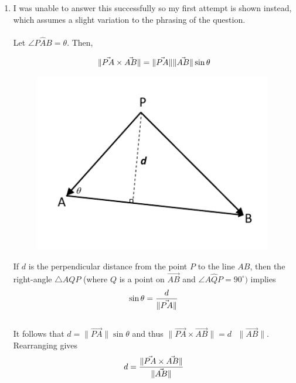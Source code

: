 \documentclass[12pt]{amsart}
\begin{document}
\begin{enumerate}
	\item I was unable to answer this successfully so my first attempt is shown instead, which assumes a 			slight variation to the phrasing of the question. \\
		\\
		Let $\angle P\hat{A}B = \theta$. Then,
		
		\begin{align}
			\|\vec{PA}\times\vec{AB}\|=\|\vec{PA}\|\|\vec{AB}\| \sin\theta \notag
		\end{align}
		
			\begin{figure}[h]
				\centering
				\includegraphics[width=4.1in]{3.pdf}
			\end{figure}
			
		If $d$ is the perpendicular distance from the point $P$ to the line $AB$, then the right-angle 
		$\triangle AQP$ (where $Q$ is a point on $\vec{AB}$ and $\angle A\hat{Q}P=90^\circ)$ implies \\
		\begin{align}
			\sin\theta=\frac{d}{\|\vec{PA}\|} \notag
		\end{align} \\
		
		It follows that $d=\|\vec{PA}\|\sin\theta$ and thus $\|\vec{PA}\times\vec{AB}\|=d\text{ }\|\vec{AB}\|$. 
		Rearranging gives \\
		\begin{align}
			d = \frac{\|\vec{PA}\times\vec{AB}\|}{\|\vec{AB}\|} \notag
		\end{align} \\
		

\end{enumerate}
\end{document}
